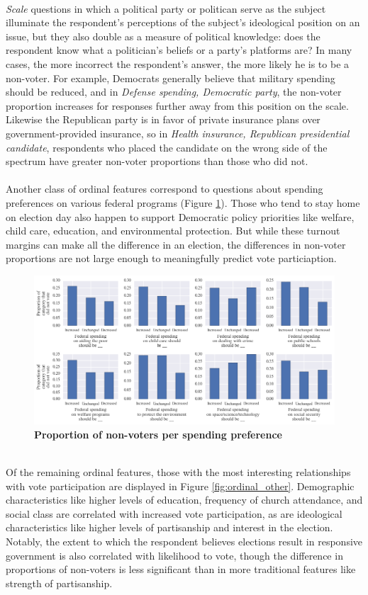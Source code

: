 \documentclass{article}
\begin{document}
	\hfill \\
	\textit{Scale} questions in which a political party or politican serve as the subject illuminate the respondent's perceptions of the subject's ideological position on an issue, but they also double as a measure of political knowledge: does the respondent know what a politician's beliefs or a party's platforms are? In many cases, the more incorrect the respondent's answer, the more likely he is to be a non-voter. For example, Democrats generally believe that military spending should be reduced, and in  \textit{Defense spending, Democratic party}, the non-voter proportion increases for responses further away from this position on the scale. Likewise the Republican party is in favor of private insurance plans over government-provided insurance, so in \textit{Health insurance, Republican presidential candidate}, respondents who placed the candidate on the wrong side of the spectrum have greater non-voter proportions than those who did not.
	\\\\
	Another class of ordinal features correspond to questions about spending preferences on various federal programs (Figure \ref{fig:ordinal_spending}). Those who tend to stay home on election day also happen to support Democratic policy priorities like welfare, child care, education, and environmental protection. But while these turnout margins can make all the difference in an election, the differences in non-voter proportions are not large enough to meaningfully predict vote particiaption.
	\begin{figure}[h!]
		\begin{center}
			\includegraphics*[width=1\linewidth]{ordinal_spending}
			\caption{\textbf{Proportion of non-voters per spending preference}}
			\label{fig:ordinal_spending}
		\end{center}
	\end{figure}
	\hfill \\
	Of the remaining ordinal features, those with the most interesting relationships with vote participation are displayed in Figure \ref{fig:ordinal_other}. Demographic characteristics like higher levels of education, frequency of church attendance, and social class are correlated with increased vote participation, as are ideological characteristics like higher levels of partisanship and interest in the election. Notably, the extent to which the respondent believes elections result in responsive government is also correlated with likelihood to vote, though the difference in proportions of non-voters is less significant than in more traditional features like strength of partisanship.
	
\end{document}
